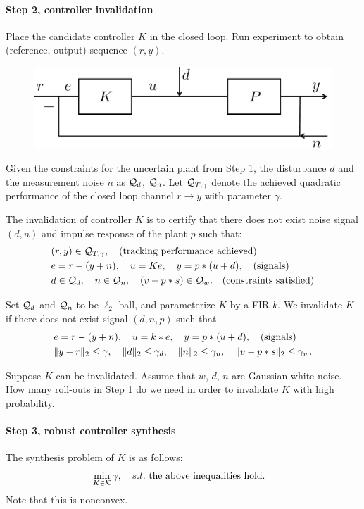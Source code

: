 \documentclass[11pt, onecolumn]{article}
\newcommand{\qq}[1]{{\color{magenta}{(#1)}}}
\begin{document}
\paragraph{Step 2, controller invalidation}

Place the candidate controller $K$ in the closed loop. Run experiment to obtain (reference, output)
sequence $(r, y)$.
\begin{figure}[h!]
  \centering
  \includegraphics[width=.5\linewidth]{sys2.pdf}
\end{figure}

Given the constraints for the uncertain plant from Step 1, the disturbance $d$ and the measurement
noise $n$ as $\mathcal Q_d$, $\mathcal Q_n$. Let $\mathcal Q_{T,\gamma}$ denote the achieved quadratic performance
of the closed loop channel $r\to y$ with parameter $\gamma$.

The invalidation of controller $K$ is to certify that there does not exist noise signal $(d, n)$ and
impulse response of the plant $p$ such that:
\begin{align*}
  & (r,y)\in\mathcal Q_{T,\gamma}, \quad\text{(tracking performance achieved)}
  \\
  & e = r-(y+n), \quad u = K e, \quad y = p * (u+d),  \quad\text{(signals)}
  \\
  & d\in\mathcal Q_d, \quad n\in\mathcal Q_n,  \quad (v-p*s )\in\mathcal Q_w. \quad\text{(constraints satisfied)}
\end{align*}

Set $\mathcal Q_d$ and $\mathcal Q_n$ to be $\ell_2$ ball, and parameterize $K$ by a FIR $k$.  We invalidate $K$
if there does not exist signal $(d, n, p )$ such that
\begin{align*}
  & e = r-(y+n), \quad u = k * e, \quad y = p * (u+d), \quad\text{(signals)}
  \\
  & \|y - r\|_2 \le \gamma, \quad \|d\|_2\le \gamma_d, \quad  \|n\|_2\le \gamma_n, \quad
  \|v-p*s\|_2\le \gamma_w.
\end{align*}
\qq{convex?}


Suppose $K$ can be invalidated. Assume that $w$, $d$, $n$ are Gaussian white noise. How many
roll-outs in Step 1 do we need in order to invalidate $K$ with high probability.


\paragraph{Step 3, robust controller synthesis}
The synthesis problem of $K$ is as follows:
\begin{align*}
  &\min_{K\in\mathcal K} \gamma,\quad s.t. \text{ the above inequalities hold}.
\end{align*}
Note that this is  nonconvex.
\end{document}
